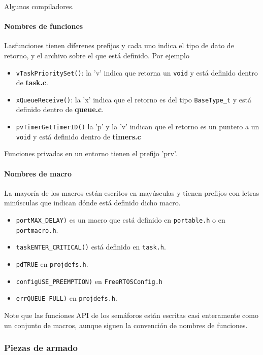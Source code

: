 Algunos compiladores.

\paragraph{Nombres de funciones}

Lasfunciones tienen diferenes prefijos y cada uno indica el tipo de dato de retorno, y el archivo sobre el que está definido. Por ejemplo

\begin{itemize}
    \item \texttt{vTaskPrioritySet()}: la 'v' indica que retorna un \texttt{void} y está definido dentro de \textbf{task.c}.
    \item \texttt{xQueueReceive()}: la 'x' indica que el retorno es del tipo \texttt{BaseType\_t} y está definido dentro de \textbf{queue.c}.
    \item \texttt{pvTimerGetTimerID()} la 'p' y la 'v' indican que el retorno es un puntero a un \texttt{void} y está definido dentro de \textbf{timers.c}
\end{itemize}

Funciones privadas en un entorno tienen el prefijo 'prv'.

\paragraph{Nombres de macro}

La mayoría de los macros están escritos en mayúsculas y tienen prefijos con letras minúsculas que indican dónde está definido dicho macro. 

\begin{itemize}
    \item \texttt{portMAX\_DELAY)} es un macro que está definido en \texttt{portable.h} o en \texttt{portmacro.h}.
    \item \texttt{taskENTER\_CRITICAL()} está definido en \texttt{task.h}.
    \item \texttt{pdTRUE} en \texttt{projdefs.h}.
    \item \texttt{configUSE\_PREEMPTION)} en \texttt{FreeRTOSConfig.h}
    \item \texttt{errQUEUE\_FULL)} en \texttt{projdefs.h}.
\end{itemize}

Note que las funciones API de los semáforos están escritas casi enteramente como un conjunto de macros, aunque siguen la convención de nombres de funciones. 

\subsubsection{Piezas de armado}

